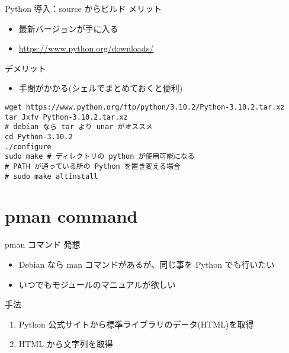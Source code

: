 \documentclass[compress,dvipdfmx,11pt]{beamer}
\begin{document}
\begin{frame}[label={sec:orgd3e1664},fragile]{Python 導入：source からビルド}
 メリット
\begin{itemize}
\item 最新バージョンが手に入る
\item \url{https://www.python.org/downloads/}
\end{itemize}

デメリット
\begin{itemize}
\item 手間がかかる(シェルでまとめておくと便利)
\end{itemize}
\begin{verbatim}
wget https://www.python.org/ftp/python/3.10.2/Python-3.10.2.tar.xz
tar Jxfv Python-3.10.2.tar.xz
# debian なら tar より unar がオススメ
cd Python-3.10.2
./configure
sudo make # ディレクトリの python が使用可能になる
# PATH が通っている所の Python を置き変える場合
# sudo make altinstall
\end{verbatim}
\end{frame}



\section{pman command}
\label{sec:orgbce2de8}
\begin{frame}[label={sec:org131fd3b}]{pman コマンド}
発想
\begin{itemize}
\item Debian なら man コマンドがあるが、同じ事を Python でも行いたい
\item いつでもモジュールのマニュアルが欲しい
\end{itemize}

手法
\begin{enumerate}
\item Python 公式サイトから標準ライブラリのデータ(HTML)を取得
\item HTML から文字列を取得
\end{enumerate}
\end{frame}
\end{document}
